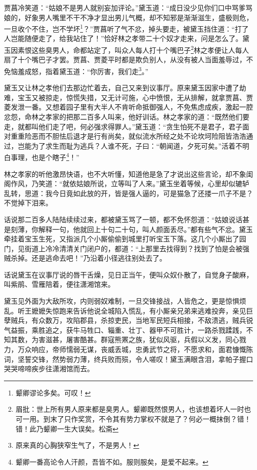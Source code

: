\documentclass[12pt,oneside]{book}
\begin{document}
贾菖冷笑道：“姑娘不是男人就别妄加评论。”黛玉道：“成日没少见你们口中骂爹骂娘的，好象男人嘴里不干不净才显出男儿气概，却不知邪是渐渐滋生，盛极则危，一旦收个不住，岂不学坏\footnote{颦卿谬论多矣。可叹！}？”贾菖听了气不忿，掉头要走，被黛玉挡住道：“打了人岂能随便走了，给我站住了！”恰好林之孝带二十个奴才走来，问是怎么了。黛玉因素恨这些臭男人，命都站定了，叫众人每人打十个嘴巴子\footnote{眉批：世上所有男人原来都是臭男人。颦卿既然恨男人，也该想着坏人一时也可一用。到末了只作奖赏，不令其有势力掌权不就是了？何必一概抹倒？错！错！此乃颦卿一生大误矣。松斋}林之孝便让人每人扇了十个嘴巴子才罢。贾菖、贾菱平时都是欺负别人，从没有被人当面羞辱过，不免恼羞成怒，指着黛玉道：“你厉害，我们走\footnote{原来真的心胸狭窄生气了，不是男人！}。”

黛玉又让林之孝他们去那边忙着去，自己又来到议事厅。原来黛玉因家中遭了劫难，宝玉又被掠走，惊慌失措，又无计可施，心中愤恨，无从排解，就拿贾菖、贾菱发泄一番。又想着园子里有大半人不肯听命抵御强人，不免焦虑成疾，激起一腔忿怨，命林之孝家的把那二百多人叫来，他好训话。林之孝家的道：“既然他们要走，就都叫他们走了吧，何必强求得罪人。”黛玉道：“贪生怕死不是君子，君子面对重重险恶而不胆怯后退才是行有尚矣，就似流水所经之处不论坎坷险阻皆浩浩通过，岂能为了求生而耻为逃兵？人谁不死，子曰：“朝闻道，夕死可矣。”活着不明白事理，也是个瞎子\footnote{颦卿一番高论令人汗颜，吾皆不如。服则服矣，是爱不起来。}！”

林之孝家的听他激昂快语，也不大听懂，知道他是急了才说出这些言论，却不象闺阁作风，乃笑道：“就依姑娘所说，立等叫了人来。”黛玉坐着等候，心里却似辘轳乱转，思道：我今日竟如此放的开，皆是强人逼的，可是猫急了还搂一爪子不是？不觉掉下泪来。

话说那二百多人陆陆续续过来，都被黛玉骂了一顿，都不免怀怨道：“姑娘说话甚是刻薄，你解释一句，他就回上十句二十句，叫人颜面丢尽。”都有些气不忿。黛玉牵挂着宝玉生死，又指派几个小厮偷偷到城里打听宝玉下落。这几个小厮出了园门，见街道上冷冷清清关门闭户的，都道：“上那里去找得到？找到了怕是会被强贼杀掉。还是逃命去吧！”乃沿着小径逃往别处去了。

话说黛玉在议事厅说的唇干舌燥，见日正当午，便叫众奴仆散了，自觉身子酸麻，叫紫鹃、雪雁陪着，便往潇湘馆来。

黛玉见外面为大敌所攻，内则弱奴难制，一旦交锋接战，人皆危之，更是惊惧烦乱。听王嬷嬷失惊跑来告诉他说全城陷入慌乱，有小厮亲兄弟来逃难投奔，亲见巨孽贼兵，有众数万，攻陷郡县，杀掠吏民，当地军民短兵相接，不敌溃逃，贼兵锐气益振，乘胜追之，获牛马牲口、辎重、壮丁、器甲不可胜计，一路杀戮蹂践，不知其数，为害滋甚，屠害酷甚。群寇熊罴之族，犹似风驱，兵假以义发，同心戮力，万众响应，帝师懦弱无谋，丧威丢城，忠勇武节之将，不愿求和，面君慷慨陈词，坚誓交锋，然势弱力薄，终兵败而殒，令人嗟叹！黛玉满眼含泪，拿帕子握口哭哭啼啼疾步往潇湘馆而去。
\end{document}
